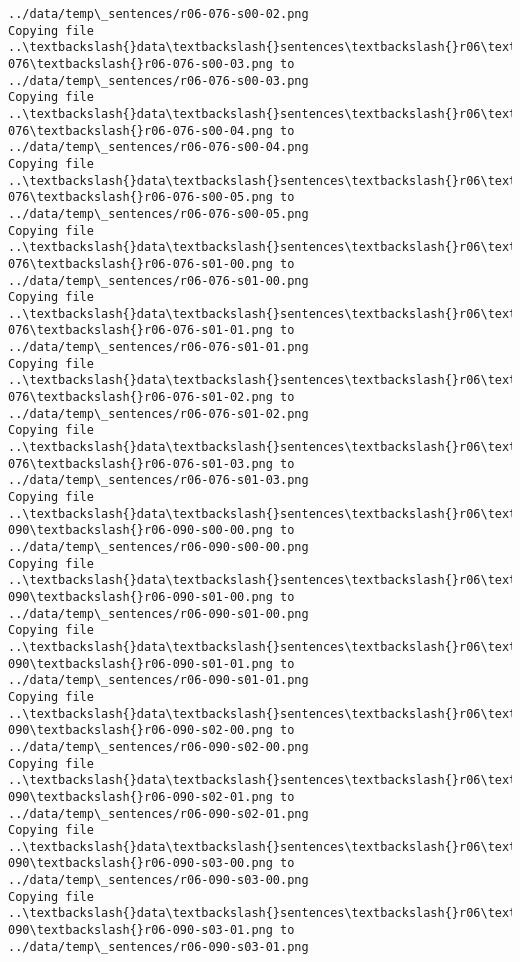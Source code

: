 \documentclass[11pt]{article}
\begin{document}
\begin{Verbatim}[commandchars=\\\{\}]
../data/temp\_sentences/r06-076-s00-02.png
Copying file ..\textbackslash{}data\textbackslash{}sentences\textbackslash{}r06\textbackslash{}r06-076\textbackslash{}r06-076-s00-03.png to
../data/temp\_sentences/r06-076-s00-03.png
Copying file ..\textbackslash{}data\textbackslash{}sentences\textbackslash{}r06\textbackslash{}r06-076\textbackslash{}r06-076-s00-04.png to
../data/temp\_sentences/r06-076-s00-04.png
Copying file ..\textbackslash{}data\textbackslash{}sentences\textbackslash{}r06\textbackslash{}r06-076\textbackslash{}r06-076-s00-05.png to
../data/temp\_sentences/r06-076-s00-05.png
Copying file ..\textbackslash{}data\textbackslash{}sentences\textbackslash{}r06\textbackslash{}r06-076\textbackslash{}r06-076-s01-00.png to
../data/temp\_sentences/r06-076-s01-00.png
Copying file ..\textbackslash{}data\textbackslash{}sentences\textbackslash{}r06\textbackslash{}r06-076\textbackslash{}r06-076-s01-01.png to
../data/temp\_sentences/r06-076-s01-01.png
Copying file ..\textbackslash{}data\textbackslash{}sentences\textbackslash{}r06\textbackslash{}r06-076\textbackslash{}r06-076-s01-02.png to
../data/temp\_sentences/r06-076-s01-02.png
Copying file ..\textbackslash{}data\textbackslash{}sentences\textbackslash{}r06\textbackslash{}r06-076\textbackslash{}r06-076-s01-03.png to
../data/temp\_sentences/r06-076-s01-03.png
Copying file ..\textbackslash{}data\textbackslash{}sentences\textbackslash{}r06\textbackslash{}r06-090\textbackslash{}r06-090-s00-00.png to
../data/temp\_sentences/r06-090-s00-00.png
Copying file ..\textbackslash{}data\textbackslash{}sentences\textbackslash{}r06\textbackslash{}r06-090\textbackslash{}r06-090-s01-00.png to
../data/temp\_sentences/r06-090-s01-00.png
Copying file ..\textbackslash{}data\textbackslash{}sentences\textbackslash{}r06\textbackslash{}r06-090\textbackslash{}r06-090-s01-01.png to
../data/temp\_sentences/r06-090-s01-01.png
Copying file ..\textbackslash{}data\textbackslash{}sentences\textbackslash{}r06\textbackslash{}r06-090\textbackslash{}r06-090-s02-00.png to
../data/temp\_sentences/r06-090-s02-00.png
Copying file ..\textbackslash{}data\textbackslash{}sentences\textbackslash{}r06\textbackslash{}r06-090\textbackslash{}r06-090-s02-01.png to
../data/temp\_sentences/r06-090-s02-01.png
Copying file ..\textbackslash{}data\textbackslash{}sentences\textbackslash{}r06\textbackslash{}r06-090\textbackslash{}r06-090-s03-00.png to
../data/temp\_sentences/r06-090-s03-00.png
Copying file ..\textbackslash{}data\textbackslash{}sentences\textbackslash{}r06\textbackslash{}r06-090\textbackslash{}r06-090-s03-01.png to
../data/temp\_sentences/r06-090-s03-01.png

\end{Verbatim}
\end{document}
